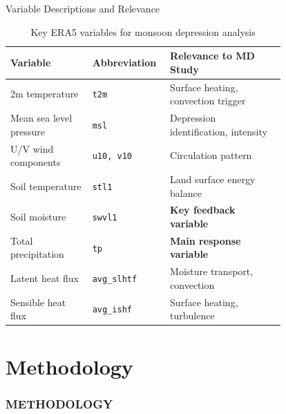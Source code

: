 \documentclass[aspectratio=169,t,xcolor=table]{beamer}
\begin{document}
\begin{frame}{Variable Descriptions and Relevance}
	\vspace{-0.5cm}
	\begin{center}
		\begin{table}
			\centering
			\footnotesize
			\caption{Key ERA5 variables for monsoon depression analysis}
			\begin{tabular}{p{0.27\linewidth} p{0.14\linewidth} p{0.38\linewidth}}
				\toprule
				\rowcolor{MyBlue!20}
				\textbf{Variable}       & \textbf{Abbreviation} & \textbf{Relevance to MD Study}       \\
				\midrule
				2m temperature          & \texttt{t2m}          & Surface heating, convection trigger  \\
				Mean sea level pressure & \texttt{msl}          & Depression identification, intensity \\
				U/V wind components     & \texttt{u10, v10}     & Circulation pattern                  \\
				Soil temperature        & \texttt{stl1}         & Land surface energy balance          \\
				Soil moisture           & \texttt{swvl1}        & \textbf{Key feedback variable}       \\
				Total precipitation     & \texttt{tp}           & \textbf{Main response variable}      \\
				Latent heat flux        & \texttt{avg\_slhtf}   & Moisture transport, convection       \\
				Sensible heat flux      & \texttt{avg\_ishf}    & Surface heating, turbulence          \\
				\bottomrule
			\end{tabular}
			\label{tab:variables}
		\end{table}
	\end{center}
\end{frame}

\section{Methodology}
\begin{frame}{}
	\frametitle{METHODOLOGY}
\end{frame}
\end{document}
